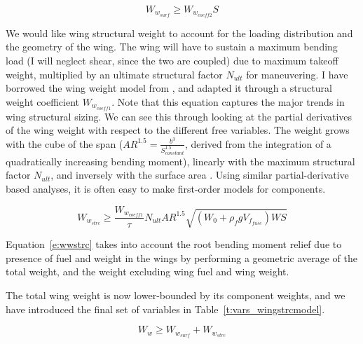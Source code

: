 \begin{equation} W_{w_{surf}} \geq W_{w_{coeff2}} S \label{e:wwsurf} \end{equation}

We would like wing structural weight to account for the loading distribution and the geometry
of the wing. The wing will have to sustain a maximum bending load (I will neglect shear, since
the two are coupled) due to maximum takeoff weight,
multiplied by an ultimate structural factor $N_{ult}$ for maneuvering.
I have borrowed the wing weight model from \cite{gp_ac_design}, and adapted it through a
structural weight coefficient $W_{w_{coeff1}}$. Note that this equation captures the
major trends in wing structural sizing. We can see this through looking at the partial
derivatives of the wing weight with respect to the different free variables.
The weight grows with the cube of the span ($AR^{1.5} = \frac{b^3}{S_{constant}^{1.5}}$, derived
from the integration of a quadratically increasing bending moment),
linearly with the maximum structural factor $N_{ult}$, and inversely with the
surface area \footnotemark. Using similar partial-derivative based analyses, it
is often easy to make first-order models for components.


\begin{equation} W_{w_{strc}} \geq \frac{W_{w_{coeff1}}}{\tau}
N_{ult} AR ^ {1.5} \sqrt{(W_0+\rho_fgV_{f_{fuse}}) WS} \label{e:wwstrc}
\end{equation}

Equation~\ref{e:wwstrc} takes into account the root
bending moment relief due to presence of fuel and weight in the wings by performing a
geometric average of the total weight, and the weight excluding wing fuel and wing weight.

The total wing weight is now lower-bounded by its component weights, and we have introduced
the final set of variables in Table~\ref{t:vars_wingstrcmodel}.

\begin{equation} W_w \geq W_{w_{surf}} + W_{w_{strc}} \label{e:ww} \end{equation}

